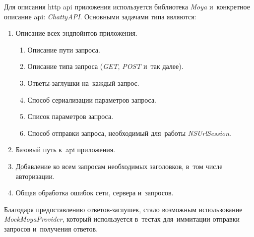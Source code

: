 Для описания \gls{http} \gls{api} приложения используется библиотека \textit{Moya} и~конкретное описание \gls{api}: \textit{ChattyAPI}. Основными задачами типа являются:
\begin{enumerate}
	\item Описание всех эндпойнтов приложения.
	\begin{enumerate}
		\item Описание пути запроса.
		\item Описание типа запроса (\textit{GET}, \textit{POST} и~так далее).
		\item Ответы-заглушки на~каждый запрос.
		\item Способ сериализации параметров запроса.
		\item Список параметров запроса.
		\item Способ отправки запроса, необходимый для~работы \textit{NSUrlSession}.
	\end{enumerate}
	\item Базовый путь к~\gls{api} приложения.
	\item Добавление ко всем запросам необходимых заголовков, в~том числе авторизации.
	\item Общая обработка ошибок сети, сервера и~запросов.
\end{enumerate}

Благодаря предоставлению ответов-заглушек, стало возможным использование \textit{MockMoyaProvider}, который используется в~тестах для~иммитации отправки запросов и~получения ответов.